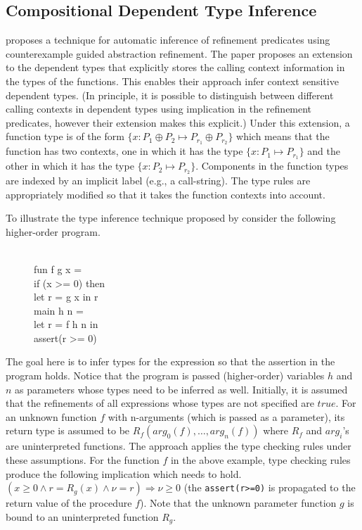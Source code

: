 \newcommand{\ctx}{\oplus}
\subsection{Compositional Dependent Type Inference}

\cite{sujag:VMCAI13} proposes a technique for automatic inference of refinement predicates 
using counterexample guided abstraction refinement. 
The paper proposes an extension to the dependent types that
explicitly stores the calling context information in the types of the functions.
This enables their approach infer context sensitive dependent types.
(In principle, it is possible to distinguish between different calling contexts in dependent types 
using implication in the refinement predicates, however their extension makes this explicit.)
Under this extension, a function type is of the form $\{ x:P_1 \ctx P_2 \mapsto P_{r_1} \ctx P_{r_2}\}$ 
which means that the function has two contexts, one in which it has the type $\{x:P_1 \mapsto  P_{r_1} \}$ 
and the other in which it has the type $\{x:P_2 \mapsto  P_{r_2} \}$. Components in the function types
are indexed by an implicit label (e.g., a call-string).
The type rules are appropriately modified so that it takes the function contexts into account.

To illustrate the type inference technique proposed by \cite{sujag:VMCAI13} consider the following higher-order program.
%
\begin{figure}
\begin{myprogram}
\\
\pnl \> fun f g x = \\
\pnl \>  \> if (x >= 0) then \\
\pnl \>  \> \>  let r = g x in r \\
\pnl \> main h n =  \\
\pnl \> \> let r = f h n in \\
\pnl \> \> assert(r >= 0)
\end{myprogram}
\end{figure}
%
The goal here is to infer types for the expression so that the assertion in the program holds.
Notice that the program is passed (higher-order) variables $h$ and $n$ as parameters whose types need to be inferred as well.
Initially, it is assumed that the refinements of all expressions whose types are not specified are $true$.
For an unknown function $f$ with n-arguments (which is passed as a parameter), 
its return type is assumed to be $R_f(arg_0(f),\ldots,arg_n(f))$ where 
$R_f$ and $arg_i$'s are uninterpreted functions.
The approach applies the type checking rules under these assumptions.
For the function $f$ in the above example, 
type checking rules produce the following implication which needs to hold.
$(x \ge 0 \wedge r = R_g(x) \wedge \nu = r) \Rightarrow \nu \ge 0$
(the \texttt{assert(r>=0)} is propagated to the return value of the procedure $f$).
Note that the unknown parameter function $g$ is bound to an uninterpreted function $R_g$.

